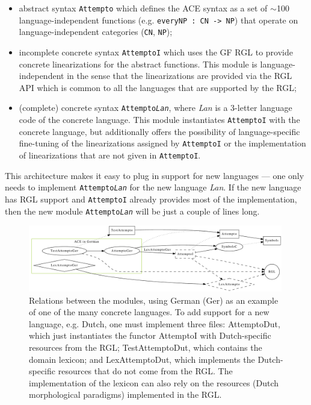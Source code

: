 \documentclass[a4paper]{article}
\begin{document}
\begin{itemize}
\item abstract syntax \texttt{Attempto} which defines the ACE syntax as
a set of $\sim$100 language-independent functions
(e.g. \verb!everyNP : CN -> NP!)
that operate on language-independent categories (\texttt{CN}, \texttt{NP});
\item incomplete concrete syntax \texttt{AttemptoI} which uses the GF RGL
to provide concrete linearizations for the abstract functions. This module
is language-independent in the sense that the linearizations are provided
via the RGL API which is common to all the languages that are supported by the
RGL;
\item (complete) concrete syntax \texttt{Attempto\textit{Lan}}, where
\textit{Lan} is a 3-letter language code of the concrete language. This
module instantiates \texttt{AttemptoI} with the concrete language, but
additionally offers the possibility of language-specific fine-tuning of the
linearizations assigned by \texttt{AttemptoI} or the implementation of
linearizations that are not given in \texttt{AttemptoI}.
\end{itemize}

This architecture makes it easy to plug in support for new languages ---
one only needs to implement \texttt{Attempto\textit{Lan}} for the new language
\textit{Lan}. If the new language has RGL support and \texttt{AttemptoI}
already provides most of the implementation, then
the new module \texttt{Attempto\textit{Lan}} will be just a couple of lines
long.


\begin{figure}[ht]
\centering
\includegraphics[width=0.99\textwidth]{modules}
\caption[Relations between the ACE grammar modules]
{Relations between the modules, using German (Ger) as an example
of one of the many concrete languages. To add support for a new language,
e.g. Dutch, one must implement three files:
AttemptoDut, which just
instantiates the functor AttemptoI with Dutch-specific resources from the RGL;
TestAttemptoDut, which contains the domain lexicon; and
LexAttemptoDut, which implements the Dutch-specific resources that
do not come from the RGL. The implementation of the lexicon can also
rely on the resources (Dutch morphological paradigms) implemented
in the RGL.}
\label{fig:modules}
\end{figure}
\end{document}
